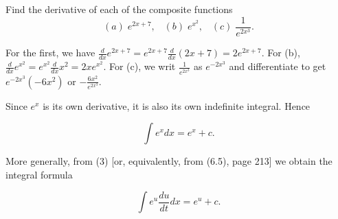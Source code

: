 \begin{example} Find the derivative of each of the composite functions
$$
(a)\; e^{2x+7}, \;\;\; (b)\; e^{x^2}, \;\;\; (c)\; \frac{1}{e^{2x^3}}.
$$

\noindent For the first, we have $\frac{d}{dx} e^{2x+7} = e^{2x + 7} \frac{d}{dx} (2x + 7) = 2e^{2x+7}$. For (b), $\frac{d}{dx} e^{x^2} = e^{x^2} \frac{d}{dx} x^2 = 2xe^{x^2}$. For (c), we writ $\frac{1}{e^{2x^3}}$ as $e^{-2x^3}$ and differentiate to get $e^{-2x^3} (-6x^2)$ or $-\frac{6x^2}{ e^{2x^3}}$.
\end{example}
\medskip

Since $e^{x}$ is its own derivative, it is also its own indefinite integral. Hence

\begin{theorem} %
$$ 
\int e^{x} dx = e^{x} + c.
$$
\end{theorem}

More generally, from (3) [or, equivalently, from (6.5), page 213] we obtain the integral formula

 
\begin{theorem} %
$$
\int e^{u} \frac{du}{dt} dx = e^u + c.
$$
\end{theorem}

